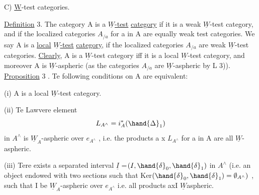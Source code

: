
C)    \underline{W}-test categories.

\uline{Definition} 3.  The category A is a  \uline{$\underline{W}$-test} \uline{category} if it is a 
weak $\underline{W}$-test\xout{\unsure{-|=}} category,  and if the localized categories $A_{/a}$  for a in
A  are equally weak test categories. We say A is a \uline{local} \uline{$\underline{W}$-test} \uline{category},
if the localized categories $A_{/a}$ are weak $\underline{W}$-test categories.
\uline{Clearly}, A is a $\underline{W}$-test category iff it is a local $\underline{W}$-test category,
and moreover A is $\underline{W}$-aspheric  (as the categories $A_{/a}$  are $\underline{W}$-aspheric
by L 3)). 
\uline{Proposition} 3 .  Te following conditions on A are equivalent:

(i)  A is a local $\underline{W}$-test category.

(ii)  Te  Lawvere element
\[ L_{A^\wedge} = i^*_A(\hand{\Delta}_1) \]
in $A^\wedge$ is $\underline{W}_A$-aspheric over $e_{A^\wedge}$ ,  i.e. the products  a x $L_{A^\wedge}$ for a in A
are all $\underline{W}$-aspheric.

(iii)  Tere exists a separated interval $\underline{I}$ =$(I,\hand{\delta}_0,\hand{\delta}_1)$ in $A^\wedge$ 
(i.e. an object endowed with two sections  such that Ker$(\hand{\delta}_0,\hand{\delta}_1) = \emptyset_{A^\wedge})$ ,
such that I be $\underline{W}_A$-aspheric over $e_{A^\wedge}$ i.e. all products axI  $\underline{W}$\unsure{\rlap{\hand{(}}-}aspheric.

